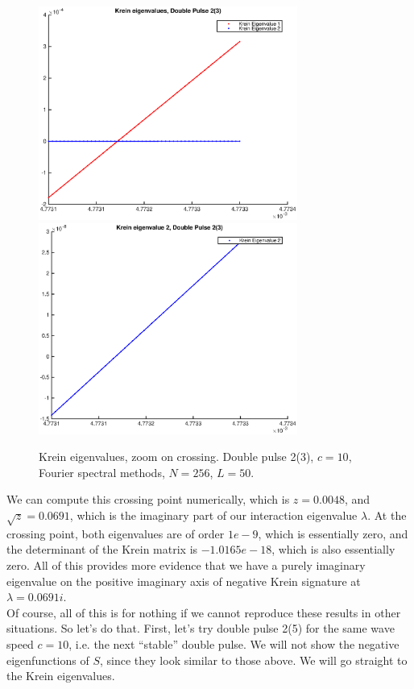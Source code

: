 \documentclass[12pt]{article}
\begin{document}
\begin{figure}[H]
	\includegraphics[width=8.5cm]{dp2kreineig1zoom}
	\includegraphics[width=8.5cm]{dp2kreineig2zoom}
	\caption{Krein eigenvalues, zoom on crossing. Double pulse 2(3), $c = 10$, Fourier spectral methods, $N = 256$, $L = 50$.}
\end{figure}

We can compute this crossing point numerically, which is $z = 0.0048$, and $\sqrt{z} = 0.0691$, which is the imaginary part of our interaction eigenvalue $\lambda$. At the crossing point, both eigenvalues are of order $1e-9$, which is essentially zero, and the determinant of the Krein matrix is $-1.0165e-18$, which is also essentially zero. All of this provides more evidence that we have a purely imaginary eigenvalue on the positive imaginary axis of negative Krein signature at $\lambda = 0.0691i$.\\

Of course, all of this is for nothing if we cannot reproduce these results in other situations. So let's do that. First, let's try double pulse 2(5) for the same wave speed $c = 10$, i.e. the next ``stable'' double pulse. We will not show the negative eigenfunctions of $S$, since they look similar to those above. We will go straight to the Krein eigenvalues.
\end{document}
